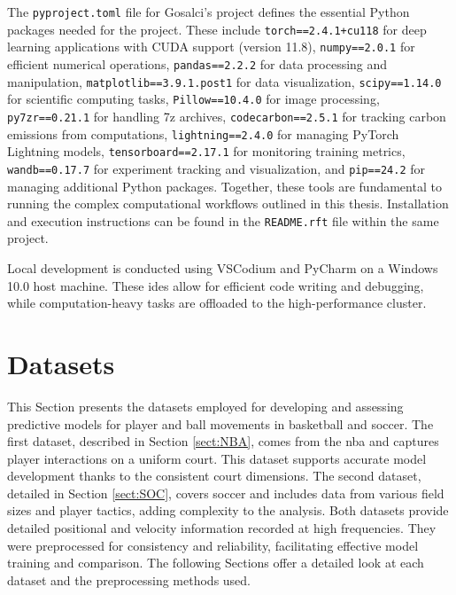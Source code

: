 \parbox{\linewidth}{
        The \texttt{pyproject.toml} file for Gosalci's project \cite{Gosalci_master_den_2024} defines the essential Python packages needed for the project. These include \texttt{torch==2.4.1+cu118} for deep learning applications with CUDA support (version 11.8), \texttt{numpy==2.0.1} for efficient numerical operations, \texttt{pandas==2.2.2} for data processing and manipulation, \texttt{matplotlib==3.9.1.post1} for data visualization, \texttt{scipy==1.14.0} for scientific computing tasks, \texttt{Pillow==10.4.0} for image processing, \texttt{py7zr==0.21.1} for handling 7z archives, \texttt{codecarbon==2.5.1} for tracking carbon emissions from computations, \texttt{lightning==2.4.0} for managing PyTorch Lightning models, \texttt{tensorboard==2.17.1} for monitoring training metrics, \texttt{wandb==0.17.7} for experiment tracking and visualization, and \texttt{pip==24.2} for managing additional Python packages. Together, these tools are fundamental to running the complex computational workflows outlined in this thesis. Installation and execution instructions can be found in the \texttt{README.rft} file within the same project.
    }

Local development is conducted using VSCodium and PyCharm on a Windows 10.0 host machine. These \glspl{ide} allow for efficient code writing and debugging, while computation-heavy tasks are offloaded to the high-performance cluster.



\section{Datasets}
\label{sec:data}

This Section presents the datasets employed for developing and assessing predictive models for player and ball movements in basketball and soccer. The first dataset, described in Section \ref{sect:NBA}, comes from the \gls{nba} and captures player interactions on a uniform court. This dataset supports accurate model development thanks to the consistent court dimensions. The second dataset, detailed in Section \ref{sect:SOC}, covers soccer and includes data from various field sizes and player tactics, adding complexity to the analysis. Both datasets provide detailed positional and velocity information recorded at high frequencies. They were preprocessed for consistency and reliability, facilitating effective model training and comparison. The following Sections offer a detailed look at each dataset and the preprocessing methods used.

